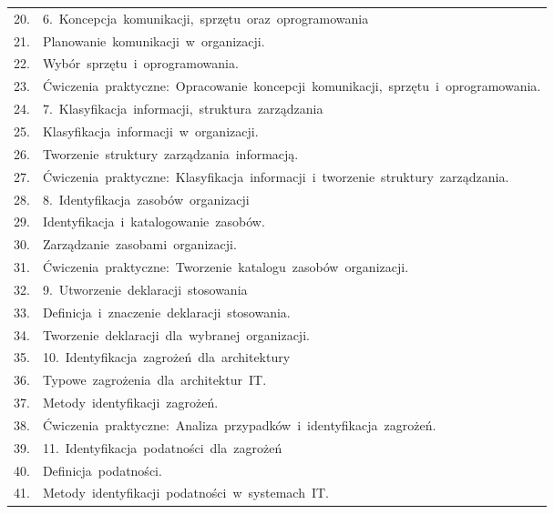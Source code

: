 \documentclass[12pt, a4paper]{article}
\begin{document}
{\begin{longtable}{m{1.5cm}m{14.5cm}}
  \rowcolor{tableRowAlt} 20. & 6. Koncepcja komunikacji, sprzętu oraz oprogramowania \\
  \rowcolor{tableRowLight} 21. & Planowanie komunikacji w organizacji. \\
  \rowcolor{tableRowAlt} 22. & Wybór sprzętu i oprogramowania. \\
  \rowcolor{tableRowLight} 23. & Ćwiczenia praktyczne: Opracowanie koncepcji komunikacji, sprzętu i oprogramowania. \\
  \rowcolor{tableRowAlt} 24. & 7. Klasyfikacja informacji, struktura zarządzania \\
  \rowcolor{tableRowLight} 25. & Klasyfikacja informacji w organizacji. \\
  \rowcolor{tableRowAlt} 26. & Tworzenie struktury zarządzania informacją. \\
  \rowcolor{tableRowLight} 27. & Ćwiczenia praktyczne: Klasyfikacja informacji i tworzenie struktury zarządzania. \\
  \rowcolor{tableRowAlt} 28. & 8. Identyfikacja zasobów organizacji \\
  \rowcolor{tableRowLight} 29. & Identyfikacja i katalogowanie zasobów. \\
  \rowcolor{tableRowAlt} 30. & Zarządzanie zasobami organizacji. \\
  \rowcolor{tableRowLight} 31. & Ćwiczenia praktyczne: Tworzenie katalogu zasobów organizacji. \\
  \rowcolor{tableRowAlt} 32. & 9. Utworzenie deklaracji stosowania \\
  \rowcolor{tableRowLight} 33. & Definicja i znaczenie deklaracji stosowania. \\
  \rowcolor{tableRowAlt} 34. & Tworzenie deklaracji dla wybranej organizacji. \\
  \rowcolor{tableRowLight} 35. & 10. Identyfikacja zagrożeń dla architektury \\
  \rowcolor{tableRowAlt} 36. & Typowe zagrożenia dla architektur IT. \\
  \rowcolor{tableRowLight} 37. & Metody identyfikacji zagrożeń. \\
  \rowcolor{tableRowAlt} 38. & Ćwiczenia praktyczne: Analiza przypadków i identyfikacja zagrożeń. \\
  \rowcolor{tableRowLight} 39. & 11. Identyfikacja podatności dla zagrożeń \\
  \rowcolor{tableRowAlt} 40. & Definicja podatności. \\
  \rowcolor{tableRowLight} 41. & Metody identyfikacji podatności w systemach IT. \\

\end{longtable}}
\end{document}
